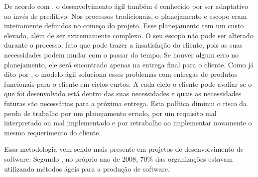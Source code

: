 De acordo com \cite{soares}, o desenvolvimento ágil também é conhecido por ser adaptativo ao invés de preditivo. Nos processos tradicionais, o planejamento e escopo eram inteiramente definidos no começo do projeto. Esse planejamento tem um custo elevado, além de ser extremamente complexo. O seu escopo não pode ser alterado durante o processo, fato que pode trazer a insatisfação do cliente, pois as suas necessidades podem mudar com o passar do tempo. Se houver algum erro no planejamento, ele será encontrado apenas na entrega final para o cliente. Como já dito por \cite{pressman2009engenharia}, o modelo ágil soluciona esses problemas com entregas de produtos funcionais para o cliente em ciclos curtos. A cada ciclo o cliente pode avaliar se o que foi desenvolvido está dentro das suas necessidades e quais as necessidades futuras são necessárias para a próxima entrega. Esta política diminui o risco da perda de trabalho por um planejamento errado, por um requisito mal interpretado ou mal implementado e por retrabalho ao implementar novamente o mesmo requerimento do cliente.

Essa metodologia vem sendo mais presente em projetos de desenvolvimento de software. Segundo \cite{thegood}, no próprio ano de 2008, 70\% das organizações estavam utilizando métodos ágeis para a produção de software.
